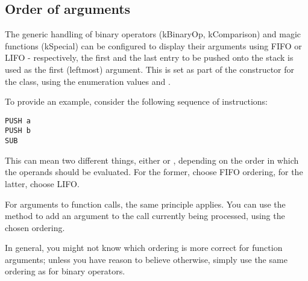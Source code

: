 \subsection{Order of arguments}
\label{sec:argOrder}
The generic handling of binary operators (kBinaryOp, kComparison) and magic functions (kSpecial) can be configured to display their arguments using FIFO or LIFO - respectively, the first and the last entry to be pushed onto the stack is used as the first (leftmost) argument. This is set as part of the constructor for the  class, using the enumeration values  and .

To provide an example, consider the following sequence of instructions:

\begin{bytecode}
\begin{lstlisting}
PUSH a
PUSH b
SUB
\end{lstlisting}
\end{bytecode}

This can mean two different things, either  or , depending on the order in which the operands should be evaluated. For the former, choose FIFO ordering, for the latter, choose LIFO.

For arguments to function calls, the same principle applies. You can use the  method to add an argument to the call currently being processed, using the chosen ordering.

In general, you might not know which ordering is more correct for function arguments; unless you have reason to believe otherwise, simply use the same ordering as for binary operators.
